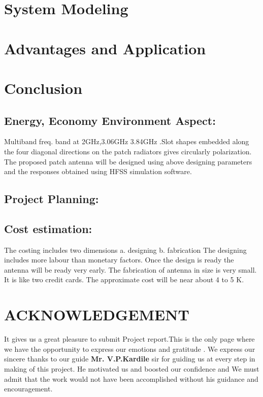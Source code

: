 \documentclass[12pt]{article}
\begin{document}
\section{System Modeling}\label{sec:System Modeling}
 

\section{Advantages and Application}
 
         	


\cleardoublepage

\section{Conclusion}\label{sec:Conclusion}
    \subsection{Energy, Economy Environment Aspect:}\label{sub:Energy, Economy Environment Aspect:}
       Multiband freq. band at 2GHz,3.06GHz  3.84GHz  .Slot shapes embedded along the four diagonal directions on the patch radiators gives circularly polarization. The proposed patch antenna will be designed using above designing parameters and the responses obtained using HFSS simulation software.
    \subsection{Project Planning:}\label{sub:Project Planning:}

    \subsection{Cost estimation:}\label{sub:Cost estimation:}
      The costing includes two dimensions
      a.  designing
      b. fabrication
      The designing includes more labour than monetary factors. Once the design is ready the antenna will be ready very early.  The fabrication of antenna in size is very small.  It is like two credit cards.
      The approximate cost will be near about 4 to 5 K.
\cleardoublepage

\section{ACKNOWLEDGEMENT}
  \justify
	It gives us a great pleasure to submit  Project report.This is the only page where we have the opportunity to express our emotions and gratitude . We express our sincere thanks to our guide \textbf{Mr. V.P.Kardile} sir for guiding us at every step in making of this project. He motivated us and boosted our confidence and We must admit that the work would not have been accomplished without his guidance and encouragement. \\
\end{document}
